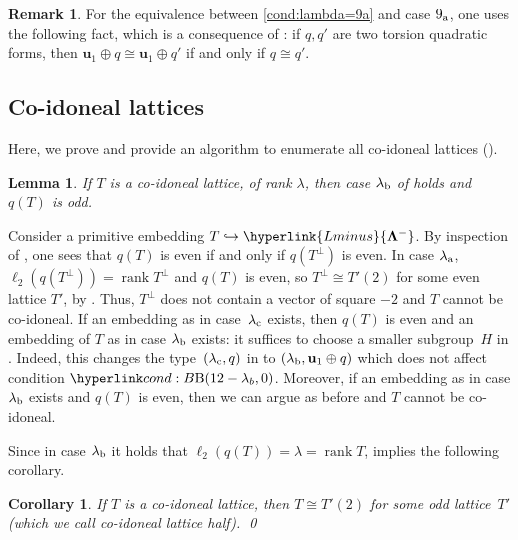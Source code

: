 \documentclass[a4paper]{amsart}
\theoremstyle{definition}
\newtheorem{remark}[definition]{Remark}
\theoremstyle{plain}
\newtheorem{lemma}[definition]{Lemma}
\newtheorem{corollary}[definition]{Corollary}
\DeclareMathOperator{\rank}{rank}
\newcommand{\bu}{\mathbf{u}}
\newcommand{\bLambda}{\mathbf{\Lambda}}
\newcommand{\Lminus}{\hyperlink{Lminus}{\bLambda^-}}
\begin{document}
\begin{remark}
For the equivalence between \ref{cond:lambda=9a} and case \(9_{\rm a}\), one uses the following fact, which is a consequence of \cite[Prop. 1.8.2]{Nikulin:int.sym.bilinear.forms}: if \(q,q'\) are two torsion quadratic forms, then \(\bu_1 \oplus q \cong \bu_1 \oplus q'\) if and only if \(q \cong q'\). %
\end{remark}



\subsection{Co-idoneal lattices} \label{subsec:co-idoneal}
Here, we prove  and provide an algorithm to enumerate all co-idoneal lattices ().

\begin{lemma} \label{lem:case_lambda_b} 
If \(T\) is a co-idoneal lattice, of rank \(\lambda\), then case \(\lambda_{\rm b}\) of  holds and \(q(T)\) is odd.
\end{lemma} 
\proof
Consider a primitive embedding \(T \hookrightarrow \Lminus\).
By inspection of , one sees that \(q(T)\) is even if and only if \(q(T^\perp)\) is even. 
In case \(\lambda_{\rm a}\), \(\ell_2(q(T^\perp)) = \rank T^\perp\) and \(q(T)\) is even, so \(T^\perp \cong T'(2)\) for some even lattice \(T'\), by . 
Thus, \(T^\perp\) does not contain a vector of square \(-2\) and \(T\) cannot be co-idoneal.
If an embedding as in case~\(\lambda_{\rm c}\) exists, then \(q(T)\) is even and an embedding of \(T\) as in case \(\lambda_{\rm b}\) exists: it suffices to choose a smaller subgroup~\(H\) in . Indeed, this changes the type~\((\lambda_{\rm c}, q)\) in  to \((\lambda_{\rm b}, \bu_1 \oplus q)\) which does not affect condition \(\condB{12-\lambda_b,0}\). 
Moreover, if an embedding as in case \(\lambda_{\rm b}\) exists and \(q(T)\) is even, then we can argue as before and \(T\) cannot be co-idoneal.
\endproof

Since in case \(\lambda_{\rm b}\) it holds that \(\ell_2(q(T)) = \lambda = \rank T\),  implies the following corollary.

\begin{corollary} \label{cor:half.exc} 
If \(T\) is a co-idoneal lattice, then \(T \cong T'(2)\) for some odd lattice~\(T'\) (which we call \emph{co-idoneal lattice half}). \qed
\end{corollary} 
\end{document}
